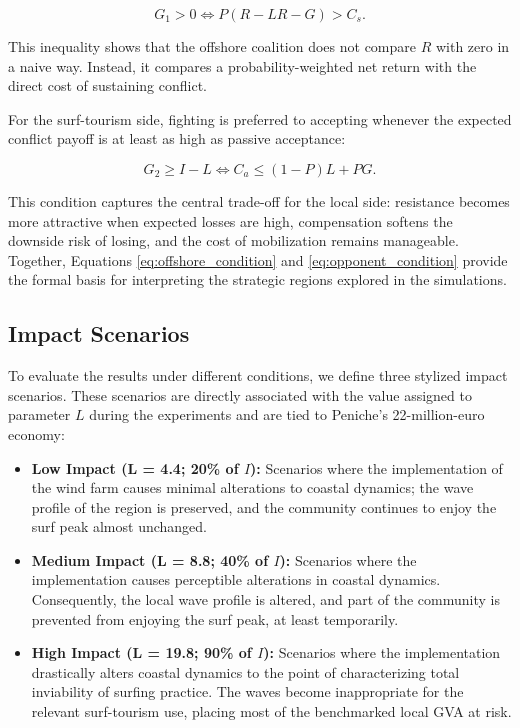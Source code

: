 \documentclass[final,times,authoryear]{elsarticle}
\newcommand{\warn}[1]{{\color{red} {#1}}}
\begin{document}
    \begin{equation}
    G_1 > 0 \Longleftrightarrow P(R-LR-G) > C_s.
    \label{eq:offshore_condition}
    \end{equation}

This inequality shows that the offshore coalition does not compare $R$ with zero in a naive way. Instead, it compares a probability-weighted net return with the direct cost of sustaining conflict.

For the surf-tourism side, fighting is preferred to accepting whenever the expected conflict payoff is at least as high as passive acceptance:

    \begin{equation}
    G_2 \geq I-L \Longleftrightarrow C_a \leq (1-P)L + PG.
    \label{eq:opponent_condition}
    \end{equation}

This condition captures the central trade-off for the local side: resistance becomes more attractive when expected losses are high, compensation softens the downside risk of losing, and the cost of mobilization remains manageable. Together, Equations \ref{eq:offshore_condition} and \ref{eq:opponent_condition} provide the formal basis for interpreting the strategic regions explored in the simulations.

\subsection{Impact Scenarios}

To evaluate the results under different conditions, we define three stylized impact scenarios. These scenarios are directly associated with the value assigned to parameter $L$ during the experiments and are tied to Peniche's 22-million-euro economy:

    \begin{itemize}
        \item \textbf{Low Impact (L = 4.4; 20\% of $I$):} Scenarios where the implementation of the wind farm causes minimal alterations to
          coastal dynamics; the wave profile of the region is preserved, and the community continues to enjoy the surf peak almost
          unchanged.
        \item \textbf{Medium Impact (L = 8.8; 40\% of $I$):} Scenarios where the implementation causes perceptible alterations in coastal
          dynamics. Consequently, the local wave profile is altered, and part of the community is prevented from enjoying the surf
          peak, at least temporarily.
        \item \textbf{High Impact (L = 19.8; 90\% of $I$):} Scenarios where the implementation drastically alters coastal dynamics to the point
          of characterizing total inviability of surfing practice. \warn{The waves become inappropriate for the relevant surf-tourism use, placing most of the benchmarked local GVA at risk.}
    \end{itemize}
\end{document}
